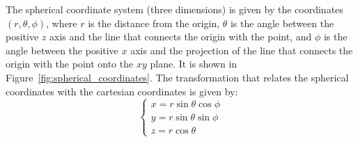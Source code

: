 The spherical coordinate system (three dimensions) is given by the coordinates $(r, \theta, \phi)$, where $r$ is the distance from the origin, $\theta$ is the angle between the positive $z$ axis and the line that connects the origin with the point, and $\phi$ is the angle between the positive $x$ axis and the projection of the line that connects the origin with the point onto the $xy$ plane. It is shown in Figure~\ref{fig:spherical_coordinates}.
The transformation that relates the spherical coordinates with the cartesian coordinates is given by:
\begin{equation*}
    \begin{cases}
        x = r \sin \theta \cos \phi \\
        y = r \sin \theta \sin \phi \\
        z = r \cos \theta
    \end{cases}
\end{equation*}

